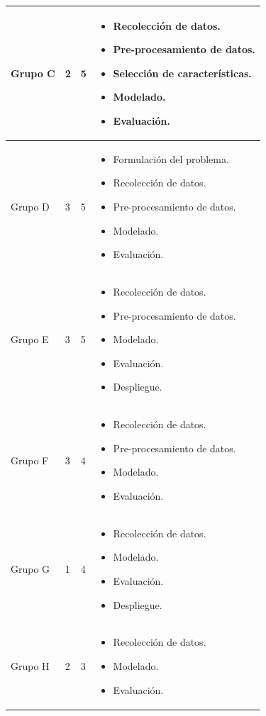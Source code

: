 \begin{longtable}{|M{3cm}|M{2.5cm}|M{2.5cm}|M{6cm}|}
		\\
		\hline
		{Grupo C}
		& 2
		& 5
		& 
		\begin{itemize}[noitemsep,leftmargin=*]
			\item Recolección de datos.
			\item Pre-procesamiento de datos.
			\item Selección de características.
			\item Modelado.
			\item Evaluación.
		\end{itemize} 
		\\
		\hline
		{Grupo D}
		& 3
		& 5
		& 
		\begin{itemize}[noitemsep,leftmargin=*]
			\item Formulación del problema.
			\item Recolección de datos.
			\item Pre-procesamiento de datos.
			\item Modelado.
			\item Evaluación.
		\end{itemize} 
		\\
		\hline
		{Grupo E}
		& 3
		& 5
		& 
		\begin{itemize}[noitemsep,leftmargin=*]
			\item Recolección de datos.
			\item Pre-procesamiento de datos.
			\item Modelado.
			\item Evaluación.
			\item Despliegue.
		\end{itemize} 
		\\
		\hline
		{Grupo F}
		& 3
		& 4
		& 
		\begin{itemize}[noitemsep,leftmargin=*]
			\item Recolección de datos.
			\item Pre-procesamiento de datos.
			\item Modelado.
			\item Evaluación.
		\end{itemize} 
		\\
		\hline
		{Grupo G}
		& 1
		& 4
		& 
		\begin{itemize}[noitemsep,leftmargin=*]
			\item Recolección de datos.
			\item Modelado.
			\item Evaluación.
			\item Despliegue.
		\end{itemize} 
		\\
		\hline
		{Grupo H}
		& 2
		& 3
		& 
		\begin{itemize}[noitemsep,leftmargin=*]
			\item Recolección de datos.
			\item Modelado.
			\item Evaluación.
		\end{itemize} 
		\\
		\hline
	\end{longtable}%
